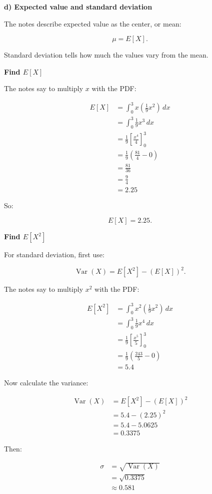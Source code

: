 \documentclass[10pt]{article}
\begin{document}
\textbf{d) Expected value and standard deviation}

The notes describe expected value as the center, or mean:

\[
\mu=E[X].
\]

Standard deviation tells how much the values vary from the mean.

\textbf{Find $E[X]$}

The notes say to multiply $x$ with the PDF:

\begin{align*}
E[X]
&=
\int_0^3
x\left(\frac{1}{9}x^2\right)\,dx \\[2mm]
&=
\int_0^3
\frac{1}{9}x^3\,dx \\[2mm]
&=
\frac{1}{9}
\left[
\frac{x^4}{4}
\right]_0^3 \\[2mm]
&=
\frac{1}{9}
\left(
\frac{81}{4}-0
\right) \\[2mm]
&=
\frac{81}{36} \\[2mm]
&=
\frac{9}{4} \\[2mm]
&=2.25
\end{align*}

So:

\[
E[X]=2.25.
\]

\textbf{Find $E[X^2]$}

For standard deviation, first use:

\[
\operatorname{Var}(X)
=
E[X^2]-(E[X])^2.
\]

The notes say to multiply $x^2$ with the PDF:

\begin{align*}
E[X^2]
&=
\int_0^3
x^2\left(\frac{1}{9}x^2\right)\,dx \\[2mm]
&=
\int_0^3
\frac{1}{9}x^4\,dx \\[2mm]
&=
\frac{1}{9}
\left[
\frac{x^5}{5}
\right]_0^3 \\[2mm]
&=
\frac{1}{9}
\left(
\frac{243}{5}-0
\right) \\[2mm]
&=
5.4
\end{align*}

Now calculate the variance:

\begin{align*}
\operatorname{Var}(X)
&=
E[X^2]-(E[X])^2 \\[2mm]
&=
5.4-(2.25)^2 \\[2mm]
&=
5.4-5.0625 \\[2mm]
&=
0.3375
\end{align*}

Then:

\begin{align*}
\sigma
&=
\sqrt{\operatorname{Var}(X)} \\[2mm]
&=
\sqrt{0.3375} \\[2mm]
&\approx 0.581
\end{align*}
\end{document}
